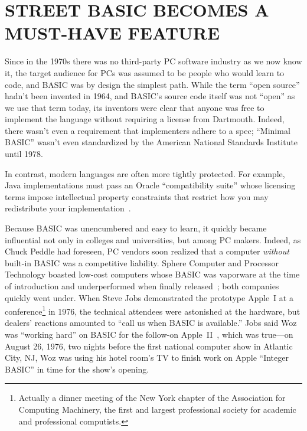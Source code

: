 
\section{STREET BASIC BECOMES A MUST-HAVE FEATURE}


Since in the 1970s there was no third-party PC software industry as we
now know it, the target audience for PCs was assumed to be people who
would learn to code, and BASIC was by design the simplest path.
While the term ``open source'' hadn't been invented in 1964, and BASIC's
source code itself was not ``open'' as we use that term today, its
inventors were clear that anyone was free to implement the language
without requiring a license from Dartmouth.
Indeed, there wasn't even a requirement that implementers adhere to a
spec; ``Minimal BASIC'' wasn't even standardized by the American
National Standards Institute until 1978.

\begin{tangent}{}
In contrast, modern languages are often more tightly protected.
For example, Java implementations must pass an Oracle ``compatibility
suite'' whose licensing terms impose intellectual property constraints
that restrict how you may redistribute your
implementation~\cite{apache-java-letter,apache-resigns-jcp}.
\end{tangent}

Because BASIC was unencumbered and easy to learn, it quickly became
influential not only in colleges and universities, but among PC
makers.
Indeed, as Chuck Peddle had foreseen, PC vendors soon realized that a
computer \emph{without} built-in BASIC was a competitive liability.
Sphere Computer and Processor Technology boasted low-cost computers
whose BASIC was vaporware at the time of introduction and
underperformed when finally released~\cite[p. 114, 134]{veit}; both
companies quickly went under.
When Steve Jobs demonstrated the prototype Apple~I at a
conference\footnote{Actually a dinner meeting of the New York chapter
of the Association for Computing Machinery, the first and largest
professional society for academic and professional computists.} in
1976, the technical attendees were astonished at the hardware, but
dealers' reactions amounted to ``call us when BASIC is available.''
Jobs said Woz was ``working hard'' on BASIC for the follow-on
Apple~II~\cite[pp. 92ff]{veit}, which was true---on August 26, 1976,
two nights before the first national computer show in Atlantic City,
NJ, Woz was using his hotel room's TV to finish work on Apple
``Integer BASIC'' in time for the show's opening.

